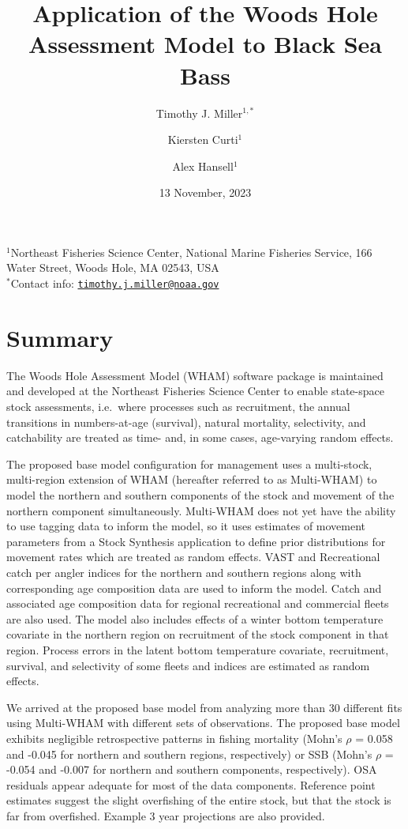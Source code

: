 \documentclass[
]{article}
\title{Application of the Woods Hole Assessment Model to Black Sea Bass}
\author{Timothy J. Miller\(^{1,*}\) \and Kiersten Curti\(^1\) \and Alex Hansell\(^1\)}
\date{13 November, 2023}
\begin{document}
\maketitle

\(^1\)Northeast Fisheries Science Center, National Marine Fisheries Service, 166 Water Street, Woods Hole, MA 02543, USA\\
\(^*\)Contact info: \href{mailto:timothy.j.miller@noaa.gov}{\nolinkurl{timothy.j.miller@noaa.gov}}

\pagebreak

\hypertarget{summary}{%
\section*{Summary}\label{summary}}

The Woods Hole Assessment Model (WHAM) software package is maintained and developed at the Northeast Fisheries Science Center to enable state-space stock assessments, i.e.~where processes such as recruitment, the annual transitions in numbers-at-age (survival), natural mortality, selectivity, and catchability are treated as time- and, in some cases, age-varying random effects.

The proposed base model configuration for management uses a multi-stock, multi-region extension of WHAM (hereafter referred to as Multi-WHAM) to model the northern and southern components of the stock and movement of the northern component simultaneously. Multi-WHAM does not yet have the ability to use tagging data to inform the model, so it uses estimates of movement parameters from a Stock Synthesis application to define prior distributions for movement rates which are treated as random effects. VAST and Recreational catch per angler indices for the northern and southern regions along with corresponding age composition data are used to inform the model. Catch and associated age composition data for regional recreational and commercial fleets are also used. The model also includes effects of a winter bottom temperature covariate in the northern region on recruitment of the stock component in that region. Process errors in the latent bottom temperature covariate, recruitment, survival, and selectivity of some fleets and indices are estimated as random effects.

We arrived at the proposed base model from analyzing more than 30 different fits using Multi-WHAM with different sets of observations. The proposed base model exhibits negligible retrospective patterns in fishing mortality (Mohn's \(\rho\) = 0.058 and -0.045 for northern and southern regions, respectively) or SSB (Mohn's \(\rho\) = -0.054 and -0.007 for northern and southern components, respectively). OSA residuals appear adequate for most of the data components. Reference point estimates suggest the slight overfishing of the entire stock, but that the stock is far from overfished. Example 3 year projections are also provided.
\end{document}
